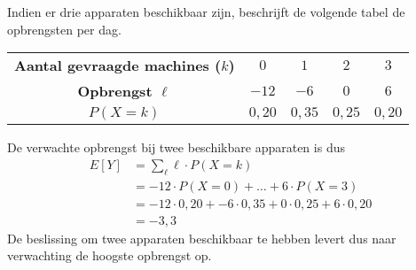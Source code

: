\begin{enumerate}[label=(\alph*)]
{            Indien er drie apparaten beschikbaar zijn, beschrijft de volgende tabel de opbrengsten per dag.

            \begin{center}
                \begin{tabular}{ccccc}
                    \toprule
                        {\bfseries Aantal gevraagde machines ($k$)} & $0$ & $1$ & $2$ & $3$ \\        
                        \cmidrule{1-1} \cmidrule{2-2} \cmidrule{3-3} \cmidrule{4-4} \cmidrule{5-5}
                        {\bfseries Opbrengst $\ell$} & $-12$ & $-6$ & $0$ & $6$ \\        
                        \cmidrule{1-1} \cmidrule{2-2} \cmidrule{3-3} \cmidrule{4-4} \cmidrule{5-5}
                        {\bfseries $P(X=k)$} & $0,20$ & $0,35$ & $0,25$ & $0,20$ \\
                    \bottomrule
                \end{tabular}
            \end{center}
            De verwachte opbrengst bij twee beschikbare apparaten is dus
            \begin{align*}
                E[Y]    &= \sum_\ell \ell \cdot P(X=k) \\
                        &=  -12 \cdot P(X=0) + \ldots + 6 \cdot P(X=3) \\
                        &= -12 \cdot 0,20 + -6 \cdot 0,35 + 0 \cdot 0,25 + 6 \cdot 0,20 \\
                        &= -3,3
            \end{align*}
            De beslissing om twee apparaten beschikbaar te hebben levert dus naar verwachting de hoogste opbrengst op.
        }
\end{enumerate}